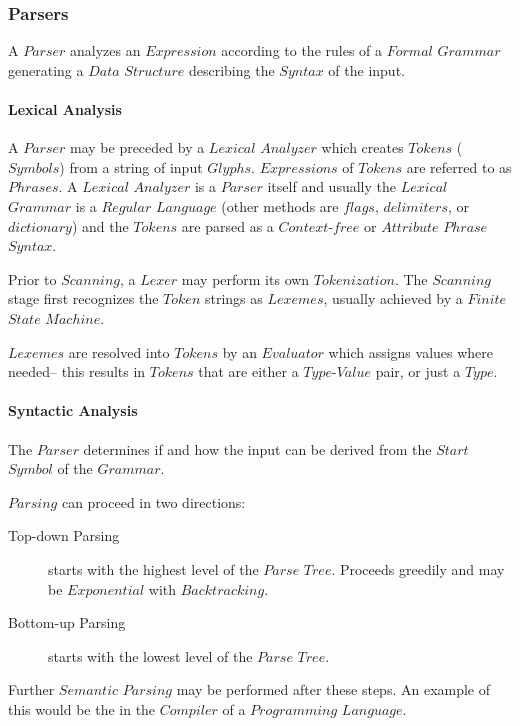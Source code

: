 \documentclass{article}
\begin{document}
\subsubsection{Parsers}

    A $Parser$ analyzes an $Expression$ according to the rules of a
    $Formal$ $Grammar$ generating a $Data$ $Structure$ describing the
    $Syntax$ of the input.

    \paragraph{Lexical Analysis}
    A $Parser$ may be preceded by a $Lexical$ $Analyzer$ which creates
    $Tokens$ ($Symbols$) from a string of input
    $Glyphs$. $Expressions$ of $Tokens$ are referred to as
    $Phrases$. A $Lexical$ $Analyzer$ is a $Parser$ itself and usually
    the $Lexical$ $Grammar$ is a $Regular$ $Language$ (other methods
    are $flags$, $delimiters$, or $dictionary$) and the $Tokens$ are
    parsed as a $Context$-$free$ or $Attribute$ $Phrase$ $Syntax$.

    Prior to $Scanning$, a $Lexer$ may perform its own $Tokenization$.
    The $Scanning$ stage first recognizes the $Token$ strings as
    $Lexemes$, usually achieved by a $Finite$ $State$ $Machine$.

    $Lexemes$ are resolved into $Tokens$ by an $Evaluator$ which
    assigns values where needed-- this results in $Tokens$ that are
    either a $Type$-$Value$ pair, or just a $Type$.

    \paragraph{Syntactic Analysis}

    The $Parser$ determines if and how the input can be derived from
    the $Start$ $Symbol$ of the $Grammar$.

    $Parsing$ can proceed in two directions:

    \begin{description}
    \item[Top-down Parsing]
    starts with the highest level of the $Parse$ $Tree$. Proceeds
    greedily and may be $Exponential$ with $Backtracking$.
    \item[Bottom-up Parsing]
    starts with the lowest level of the $Parse$ $Tree$.
    \end{description}

    Further $Semantic$ $Parsing$ may be performed after these
    steps. An example of this would be the in the $Compiler$ of a
    $Programming$ $Language$.
\end{document}
